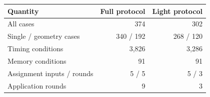 \begin{tabular}{lrr}
\toprule
Quantity & Full protocol & Light protocol \\
\midrule
All cases & 374 & 302 \\
Single / geometry cases & 340 / 192 & 268 / 120 \\
Timing conditions & 3,826 & 3,286 \\
Memory conditions & 91 & 91 \\
Assignment inputs / rounds & 5 / 5 & 5 / 3 \\
Application rounds & 9 & 3 \\
\bottomrule
\end{tabular}
